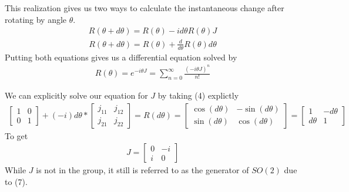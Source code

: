\documentclass[compress,aspectratio=169,10pt,usenames,dvipsnames]{beamer}
\begin{document}
%
%
\begin{frame}
\vfill
This realization gives us two ways to calculate the instantaneous change after rotating by angle $\theta$.
\vfill
\begin{equation}
	\begin{aligned}
		R(\theta + d\theta) = R(\theta) - id\theta R(\theta)J
	\end{aligned}
\end{equation}  
\begin{equation}
	\begin{aligned}
		R(\theta + d\theta) = R(\theta) + \frac{d}{d\theta}R(\theta)d\theta
	\end{aligned}
\end{equation}  
\vfill
Putting both equations gives us a differential equation solved by
\vfill
\begin{equation}
	\begin{aligned}
		R(\theta) = e^{-i\theta J} = \sum_{n=0}^\infty \frac{(-i\theta J)^n}{n!}
	\end{aligned}
\end{equation}  
\vfill
\end{frame}
%
%
\begin{frame}
\vfill
We can explicitly solve our equation for $J$ by taking (4) explictly
\vfill
\begin{equation}
	\begin{aligned}
		\begin{bmatrix}
			1 & 0 \\
			0 & 1
		\end{bmatrix} + (-i)d\theta * \begin{bmatrix}
			j_{11} & j_{12} \\
			j_{21} & j_{22}
		\end{bmatrix} = R(d\theta) = \begin{bmatrix}
			\cos(d\theta) & -\sin(d\theta) \\
			\sin(d\theta) & \cos(d\theta)
		\end{bmatrix} = 
		\begin{bmatrix}
			1 & -d\theta \\
			d\theta & 1
		\end{bmatrix}
	\end{aligned}
\end{equation}
\vfill
To get
\vfill
\begin{equation}
	\begin{aligned}
		J = \begin{bmatrix}
			0 & -i \\
			i & 0
		\end{bmatrix}
	\end{aligned}
\end{equation}
\vfill
While $J$ is not in the group, it still is referred to as the generator of $SO(2)$ due to (7).
\end{frame}
\end{document}
